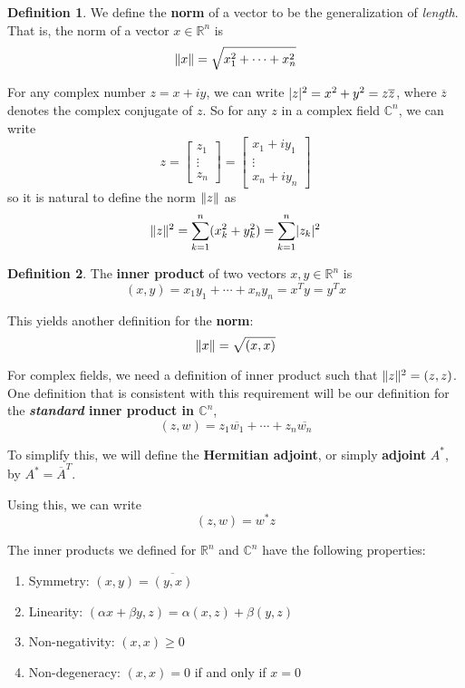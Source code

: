 \documentclass[a4paper,10pt]{book}
\DeclarePairedDelimiter\abs{\lvert}{\rvert}
\DeclarePairedDelimiter{\norm}{\lVert}{\rVert}
\theoremstyle{plain}
\theoremstyle{plain}
\theoremstyle{remark}
\theoremstyle{definition}
\newtheorem{definition}{Definition}[section]
\begin{document}
\begin{definition}
We define the \textbf{norm} of a vector to be the generalization of \textit{length}. That is, the norm of a vector $x \in \mathbb{R}^{n}$ is 
$$\norm{x} = \sqrt{x_{1}^{2} + \cdots + x_{n}^{2}}$$

For any complex number $z = x + iy$, we can write $\abs{z}^{2} = x^{2} + y^{2} = z \overline{z}$, where $\overline{z}$ denotes the complex conjugate of $z$. So for any $z$ in a complex field $\mathbb{C}^{n}$, we can write 
$$z = \begin{bmatrix}
z_{1} \\
\vdots \\
z_{n}
\end{bmatrix} = \begin{bmatrix}
x_{1} + iy_{1} \\
\vdots \\
x_{n} + iy_{n}
\end{bmatrix}$$
so it is natural to define the norm $\norm{z}$ as 
$$\norm{z}^{2} = \sum_{k = 1}^{n} (x_{k}^{2} + y_{k}^{2}) = \sum_{k=1}^{n} \abs{z_{k}}^{2}$$
\end{definition}

\begin{definition}
The \textbf{inner product} of two vectors $x, y \in \mathbb{R}^{n}$ is
$$(x, y) = x_{1} y_{1} + \cdots + x_{n} y_{n} = x^{T} y = y^{T} x$$

This yields another definition for the \textbf{norm}: 
$$\norm{x} = \sqrt{(x, x)}$$

For complex fields, we need a definition of inner product such that $\norm{z}^{2} = (z, z)$. One definition that is consistent with this requirement will be our definition for the \textbf{\textit{standard} inner product in $\mathbb{C}^{n}$}, 
$$(z, w) = z_{1} \overline{w_{1}} + \cdots + z_{n} \overline{w_{n}}$$

To simplify this, we will define the \textbf{Hermitian adjoint}, or simply \textbf{adjoint} $A^{*}$, by $A^{*} = \overline{A}^{T}$. 

Using this, we can write 
$$(z, w) = w^{*} z$$ 
\end{definition}

The inner products we defined for $\mathbb{R}^{n}$ and $\mathbb{C}^{n}$	have the following properties: 
\begin{enumerate}
	\item Symmetry: $(x, y) = \overline{(y, x)}$
	\item Linearity: $(\alpha x + \beta y, z) = \alpha (x, z) + \beta (y, z)$
	\item Non-negativity: $(x, x) \geq 0$ 
	\item Non-degeneracy: $(x, x) = 0$ if and only if $x = 0$
\end{enumerate}
\end{document}

